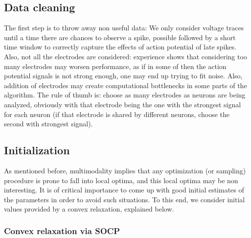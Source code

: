 \documentclass[12pt,letterpaper,fleqn]{article}
\begin{document}
\subsection{Data cleaning}
The first step is to throw away non useful data: We only consider voltage traces until a time there are chances to observe a spike, possible followed by a short time window to correctly capture the effects of action potential of late spikes. Also, not all the electrodes are considered: experience shows that considering too many electrodes may worsen performance, as if in some of then the action potential signals is not strong enough, one may end up trying to fit noise. Also, addition of electrodes may create computational bottlenecks in some parts of the algorithm. The rule of thumb is: choose as many electrodes as neurons are being analyzed, obviously with that electrode being the one with the strongest signal for each neuron (if that electrode is shared by different neurons, choose the second with strongest signal).

 \subsection{Initialization}
 As mentioned before, multimodality implies that any optimization (or sampling) procedure is prone to fall into local optima, and this local optima may be non interesting. It is of critical importance to come up with good initial estimates of the parameters in order to avoid such situations. To this end, we consider initial values provided by a convex relaxation, explained below.
 
 \subsubsection{Convex relaxation via SOCP}
 
\end{document}

